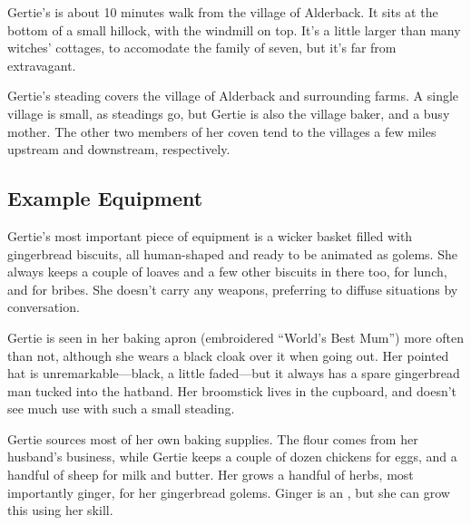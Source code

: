 Gertie's {\cottage} is about 10 minutes walk from the village of Alderback.
It sits at the bottom of a small hillock, with the windmill on top.
It's a little larger than many witches' cottages, to accomodate the family of seven, but it's far from extravagant.

Gertie's steading covers the village of Alderback and surrounding farms.
A single village is small, as steadings go, but Gertie is also the village baker, and a busy mother.
The other two members of her coven tend to the villages a few miles upstream and downstream, respectively.

\subsection{Example Equipment}

Gertie's most important piece of equipment is a wicker basket filled with gingerbread biscuits, all human-shaped and ready to be animated as golems.
She always keeps a couple of loaves and a few other biscuits in there too, for lunch, and for bribes.
She doesn't carry any weapons, preferring to diffuse situations by conversation.

Gertie is seen in her baking apron (embroidered ``World's Best Mum'') more often than not, although she wears a black cloak over it when going out.
Her pointed hat is unremarkable---black, a little faded---but it always has a spare gingerbread man tucked into the hatband.
Her broomstick lives in the cupboard, and doesn't see much use with such a small steading.

Gertie sources most of her own baking supplies.
The flour comes from her husband's business, while Gertie keeps a couple of dozen chickens for eggs, and a handful of sheep for milk and butter.
Her {\garden} grows a handful of herbs, most importantly ginger, for her gingerbread golems.
Ginger is an , but she can grow this using her  skill.
